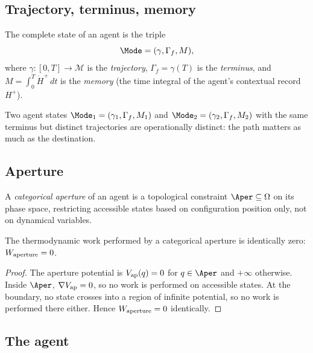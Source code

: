 \documentclass[11pt,twocolumn,a4paper]{article}
\begin{document}
\subsection{Trajectory, terminus, memory}

\begin{definition}\label{def:triple}
The complete state of an agent is the triple
\[
\Mode = (\gamma, \Gamma_f, M),
\]
where $\gamma: [0, T] \to \mathcal{M}$ is the \emph{trajectory}, $\Gamma_f = \gamma(T)$
is the \emph{terminus}, and $M = \int_0^T \dot{H}^+\,dt$ is the \emph{memory} (the time
integral of the agent's contextual record $H^+$).
\end{definition}

\begin{remark}\label{rem:nonident}
Two agent states $\Mode_1 = (\gamma_1, \Gamma_f, M_1)$ and
$\Mode_2 = (\gamma_2, \Gamma_f, M_2)$ with the same terminus but distinct trajectories
are operationally distinct: the path matters as much as the destination.
\end{remark}

\subsection{Aperture}

\begin{definition}[Aperture]\label{def:aperture}
A \emph{categorical aperture} of an agent is a topological constraint $\Aper \subseteq \Omega$
on its phase space, restricting accessible states based on configuration position only,
not on dynamical variables.
\end{definition}

\begin{theorem}\label{thm:zerowork}
The thermodynamic work performed by a categorical aperture is identically zero:
$W_{\rm aperture} = 0$.
\end{theorem}

\begin{proof}
The aperture potential is $V_{\rm ap}(q) = 0$ for $q \in \Aper$ and $+\infty$ otherwise.
Inside $\Aper$, $\nabla V_{\rm ap} = 0$, so no work is performed on accessible states.
At the boundary, no state crosses into a region of infinite potential, so no work is
performed there either. Hence $W_{\rm aperture} = 0$ identically.
\end{proof}

\subsection{The agent}
\end{document}
